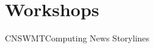 \chapter{Workshops\label{chap:Workshops}}

\begin{wsschedule}{CNS}{WMT}{Computing News Storylines}{\WShopLocA} 

\end{wsschedule}

